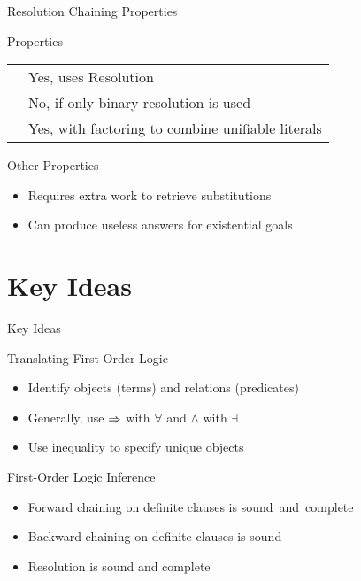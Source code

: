 \documentclass[14pt]{beamer}
\begin{document}
\begin{frame}{Resolution Chaining Properties}
	\begin{block}{Properties}
		\begin{tabular}{@{}ll@{}}
			\keyword{Sound}       & \pause Yes, uses Resolution \\
			\pause\keyword{Complete}    & \pause No, if only binary resolution is used \\
			                        & Yes, with factoring to combine unifiable literals
		\end{tabular}
	\end{block}
	\pause
	\begin{block}{Other Properties}
		\begin{itemize}
			\item Requires extra work to retrieve substitutions
			\item Can produce useless answers for existential goals
		\end{itemize}
	\end{block}
\end{frame}

\part{Key Ideas}
\begin{frame}{Key Ideas}
	\begin{block}{Translating First-Order Logic}
		\begin{itemize}
			\item Identify objects (terms) and relations (predicates)
			\item Generally, use $\Rightarrow$ with $\forall$ and $\land$ with $\exists$
			\item Use inequality to specify unique objects
		\end{itemize}
	\end{block}
	\begin{block}{First-Order Logic Inference}
		\begin{itemize}
			\item Forward chaining on definite clauses is \mbox{sound and complete}
			\item Backward chaining on definite clauses is sound
			\item Resolution is sound and complete
		\end{itemize}
	\end{block}
\end{frame}
\end{document}
